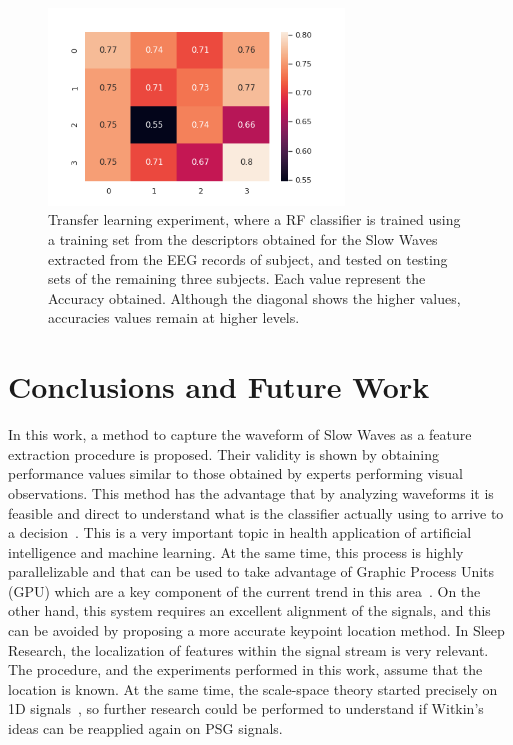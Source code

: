 \documentclass[review]{elsarticle}
\begin{document}
\begin{figure}[h!]
     \centering
     \includegraphics[width=0.7\textwidth]{images/RF_heat_map.png}
    	\caption{Transfer learning experiment, where a RF classifier is trained using a training set from the descriptors obtained for the Slow Waves extracted from the EEG records of subject, and tested on testing sets of the remaining three subjects.  Each value represent the Accuracy obtained.  Although the diagonal shows the higher values, accuracies values remain at higher levels. }
        \label{fig:heatmap}
\end{figure}


\section{Conclusions and Future Work}
\label{conclusions}
In this work, a method to capture the waveform of Slow Waves as a feature extraction procedure is proposed.  Their validity is shown by obtaining performance values similar to those obtained by experts performing visual observations.
This method has the advantage that by analyzing waveforms it is feasible and direct to understand what is the classifier actually using to arrive to a decision~\cite{Khodabandehloo2021}.  This is a very important topic in health application of artificial intelligence and machine learning.
At the same time, this process is highly parallelizable and that can be used to take advantage of Graphic Process Units (GPU) which are a key component of the current trend in this area~\cite{gong2020deep}.
On the other hand, this system requires an excellent alignment of the signals, and this can be avoided by proposing a more accurate keypoint location method.  In Sleep Research, the localization of features within the signal stream is very relevant.  The procedure, and the experiments performed in this work, assume that the location is known.  At the same time, the scale-space theory started precisely on 1D signals~\cite{Witkin1983}, so further research could be performed to understand if Witkin's ideas can be reapplied again on PSG signals.



\end{document}

